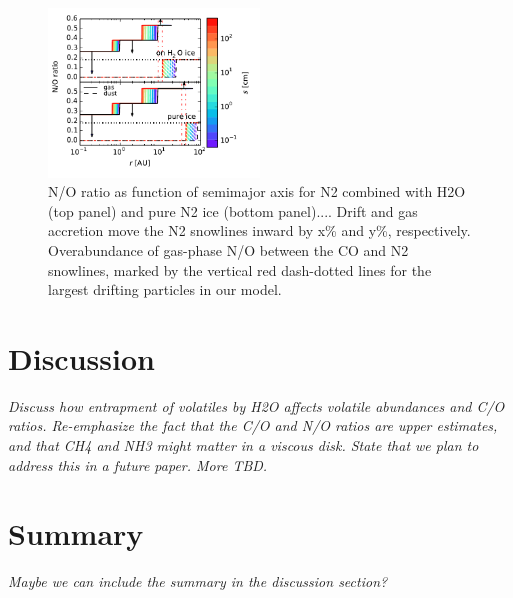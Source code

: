 \documentclass[apj]{emulateapj}
\newcommand{\emgr}[1]{\emph{ \color{gray} #1}}
\begin{document}
\begin{figure}[h!]
\centering
\includegraphics[width=0.5\textwidth]{../../figs/N_O_water_ice.pdf}
\caption{N/O ratio as function of semimajor axis for N2 combined with H2O (top panel) and pure N2 ice (bottom panel).... Drift and gas accretion move the N2 snowlines inward by x\% and y\%, respectively. Overabundance of gas-phase N/O between the CO and N2 snowlines, marked by the vertical red dash-dotted lines for the largest drifting particles in our model.} 
\label{fig:NO_ratio}
\end{figure}

\section{Discussion}
\label{sec:discussion}

\emgr{Discuss how entrapment of volatiles by H2O affects volatile abundances and C/O ratios. Re-emphasize the fact that the C/O and N/O ratios are upper estimates, and that CH4 and NH3 might matter in a viscous disk. State that we plan to address this in a future paper. More TBD.}

\section{Summary}

\emgr{Maybe we can include the summary in the discussion section?}
\end{document}
